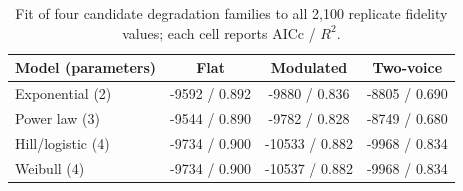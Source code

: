 \begin{table}[!ht]
\centering
\caption{Fit of four candidate degradation families to all 2,100 replicate fidelity values; each cell reports AICc / $R^2$.}
\label{tab:p2models}
\small
\begin{tabular}{lccc}
\toprule
Model (parameters) & Flat & Modulated & Two-voice \\
\midrule
Exponential (2) & -9592 / 0.892 & -9880 / 0.836 & -8805 / 0.690 \\
Power law (3) & -9544 / 0.890 & -9782 / 0.828 & -8749 / 0.680 \\
Hill/logistic (4) & -9734 / 0.900 & -10533 / 0.882 & -9968 / 0.834 \\
Weibull (4) & -9734 / 0.900 & -10537 / 0.882 & -9968 / 0.834 \\
\bottomrule
\end{tabular}
\end{table}